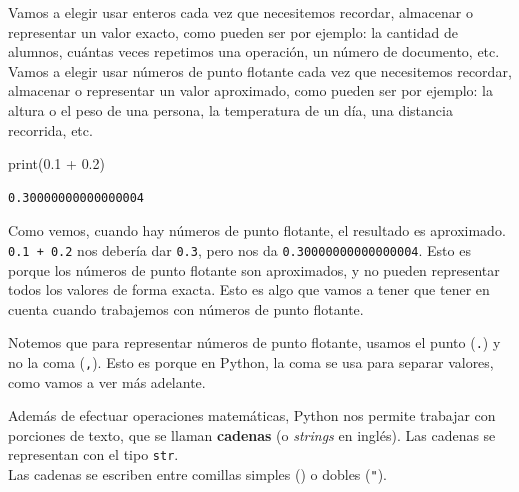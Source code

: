 \documentclass[
  letterpaper,
  DIV=11,
  numbers=noendperiod]{scrreprt}
\newenvironment{Shaded}{\begin{snugshade}}{\end{snugshade}}
\newcommand{\BuiltInTok}[1]{\textcolor[rgb]{0.00,0.23,0.31}{#1}}
\newcommand{\FloatTok}[1]{\textcolor[rgb]{0.68,0.00,0.00}{#1}}
\newcommand{\NormalTok}[1]{\textcolor[rgb]{0.00,0.23,0.31}{#1}}
\newcommand{\OperatorTok}[1]{\textcolor[rgb]{0.37,0.37,0.37}{#1}}
\begin{document}
Vamos a elegir usar enteros cada vez que necesitemos recordar, almacenar
o representar un valor exacto, como pueden ser por ejemplo: la cantidad
de alumnos, cuántas veces repetimos una operación, un número de
documento, etc.\\
Vamos a elegir usar números de punto flotante cada vez que necesitemos
recordar, almacenar o representar un valor aproximado, como pueden ser
por ejemplo: la altura o el peso de una persona, la temperatura de un
día, una distancia recorrida, etc.

\begin{Shaded}
\begin{Highlighting}[]
\BuiltInTok{print}\NormalTok{(}\FloatTok{0.1} \OperatorTok{+} \FloatTok{0.2}\NormalTok{)}
\end{Highlighting}
\end{Shaded}

\begin{verbatim}
0.30000000000000004
\end{verbatim}

Como vemos, cuando hay números de punto flotante, el resultado es
aproximado. \texttt{0.1\ +\ 0.2} nos debería dar \texttt{0.3}, pero nos
da \texttt{0.30000000000000004}. Esto es porque los números de punto
flotante son aproximados, y no pueden representar todos los valores de
forma exacta. Esto es algo que vamos a tener que tener en cuenta cuando
trabajemos con números de punto flotante.

\begin{tcolorbox}[enhanced jigsaw, opacitybacktitle=0.6, toptitle=1mm, toprule=.15mm, arc=.35mm, breakable, bottomrule=.15mm, opacityback=0, leftrule=.75mm, rightrule=.15mm, title=\textcolor{quarto-callout-note-color}{\faInfo}\hspace{0.5em}{Uso de punto}, left=2mm, bottomtitle=1mm, colframe=quarto-callout-note-color-frame, colback=white, titlerule=0mm, coltitle=black, colbacktitle=quarto-callout-note-color!10!white]

Notemos que para representar números de punto flotante, usamos el punto
(\texttt{.}) y no la coma (\texttt{,}). Esto es porque en Python, la
coma se usa para separar valores, como vamos a ver más adelante.

\end{tcolorbox}

Además de efectuar operaciones matemáticas, Python nos permite trabajar
con porciones de texto, que se llaman \textbf{cadenas} (o \emph{strings}
en inglés). Las cadenas se representan con el tipo \texttt{str}.\\
Las cadenas se escriben entre comillas simples
(\texttt{\textquotesingle{}}) o dobles (\texttt{"}).
\end{document}
